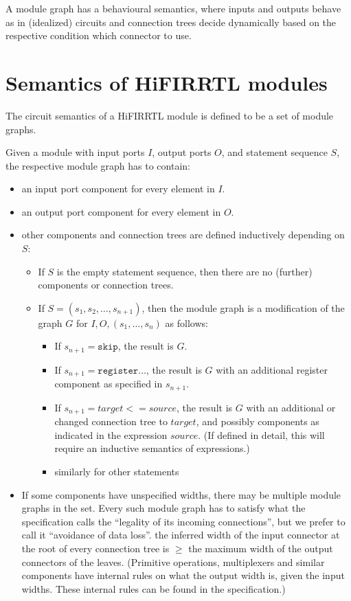 \documentclass{article}
\theoremstyle{definition}
\begin{document}
\noindent
A module graph has a behavioural semantics,
where inputs and outputs behave as in (idealized) circuits
and connection trees decide dynamically based on the respective condition
which connector to use.

\section{Semantics of HiFIRRTL modules}

The circuit semantics of a HiFIRRTL module is defined to be a set of module graphs.

Given a module with input ports $I$, output ports $O$, and statement sequence $S$,
the respective module graph has to contain:
\begin{itemize}
\item	an input port component for every element in $I$.
\item	an output port component for every element in $O$.
\item	other components and connection trees are defined inductively depending on $S$:
	\begin{itemize}
	\item	If $S$ is the empty statement sequence,
		then there are no (further) components or connection trees.
	\item	If $S = (s_1, s_2, \ldots, s_{n+1})$,
		then the module graph is a modification of the graph $G$ for $I, O, (s_1, \ldots, s_n)$ as follows:
		\begin{itemize}
		\item	If $s_{n+1} = \mathtt{skip}$, the result is $G$.
		\item	If $s_{n+1} = \mathtt{register} \ldots$, the result is $G$ with an additional register component as specified in $s_{n+1}$.
		\item	If $s_{n+1} = \mathit{target} \mathtt{<=} \mathit{source}$, the result is $G$ with an additional or changed connection tree to $\mathit{target}$,
			and possibly components as indicated in the expression $\mathit{source}$.
			(If defined in detail, this will require an inductive semantics of expressions.)
		\item	similarly for other statements
		\end{itemize}
	\end{itemize}
\item	If some components have unspecified widths, there may be multiple module graphs in the set.
	Every such module graph has to satisfy what the specification calls the ``legality of its incoming connections'',
	but we prefer to call it ``avoidance of data loss''.
	the inferred width of the input connector at the root of every connection tree is $\geq$ the maximum width of the output connectors of the leaves.
	(Primitive operations, multiplexers and similar components have internal rules
	on what the output width is, given the input widths.
	These internal rules can be found in the specification.)
\end{itemize}
\end{document}
